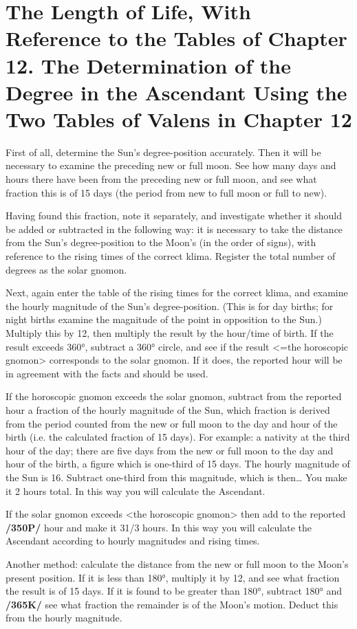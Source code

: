\section{The Length of Life, With Reference to the Tables of Chapter 12. The Determination of the Degree in the Ascendant Using the Two Tables of Valens in Chapter 12}

First of all, determine the Sun’s degree-position accurately. Then it will be necessary to examine the preceding new or full moon. See how many days and hours there have been from the preceding new or full
moon, and see what fraction this is of 15 days (the period from new to full moon or full to new). 

Having found this fraction, note it separately, and investigate whether it should be added or subtracted in the following way: it is necessary to take the distance from the Sun’s degree-position to the Moon’s (in the
order of signs), with reference to the rising times of the correct klima. Register the total number of degrees as the solar gnomon. 

Next, again enter the table of the rising times for the correct klima, and examine the hourly magnitude of the Sun’s degree-position. (This is for day births; for night births examine the magnitude of the point in opposition to the Sun.) Multiply this by 12, then multiply the result by the hour/time of birth. If the result exceeds 360°, subtract a 360° circle, and see if the result <=the horoscopic gnomon> corresponds to the solar gnomon. If it does, the reported hour will be in agreement with the facts and should be used. 

If the horoscopic gnomon exceeds the solar gnomon, subtract from the reported hour a fraction of the hourly magnitude of the Sun, which fraction is derived from the period counted from the new or full moon to the day and hour of the birth (i.e. the calculated fraction of 15 days).
For example: a nativity at the third hour of the day; there are five days from the new or full moon to the day and hour of the birth, a figure which is one-third of 15 days. The hourly magnitude of the Sun is
16. Subtract one-third from this magnitude, which is then… You make it 2 hours total. In this way you will calculate the Ascendant. 

If the solar gnomon exceeds <the horoscopic gnomon> then add to the
reported \textbf{/350P/} hour and make it 31/3 hours. In this way you will calculate the Ascendant according to hourly magnitudes and rising times.

Another method: calculate the distance from the new or full moon to the Moon’s present position. If it is less than 180°, multiply it by 12, and see what fraction the result is of 15 days. If it is found to be greater than 180°, subtract 180° and \textbf{/365K/} see what fraction the remainder is of the Moon’s motion. Deduct this from the hourly magnitude.

